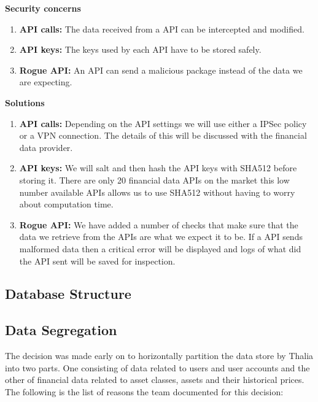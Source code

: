 \documentclass[main.tex]{subfiles}
\begin{document}
\textbf{Security concerns}
\begin{enumerate}
    \item \textbf{API calls:} The data received from a API can be intercepted and modified.
    \item \textbf{API keys:} The keys used by each API have to be stored safely.
    \item \textbf{Rogue API:} An API can send a malicious package instead of the data we are expecting.
\end{enumerate}

\textbf{Solutions}
\begin{enumerate}
    \item \textbf{API calls:} Depending on the API settings we will use either a IPSec policy or a VPN connection. The details of this will be discussed with the financial data provider.
    \item \textbf{API keys:} We will salt and then hash the API keys with SHA512 before storing it. There are only 20 financial data APIs on the market this low number available APIs allows us to use SHA512 without having to worry about computation time. 
    \item \textbf{Rogue API:} We have added a number of checks that make sure that the data we retrieve from the APIs are what we expect it to be. If a API sends malformed data then a critical error will be displayed and logs of what did the API sent will be saved for inspection. 
\end{enumerate}



\subsection{Database Structure}
\label{DB Structure}

\subsection{Data Segregation}

The decision was made early on to horizontally partition the data store by Thalia into two parts. One consisting of data related to users and user accounts and the other of financial data related to asset classes, assets and their historical prices. The following is the list of reasons the team documented for this decision:
\end{document}
